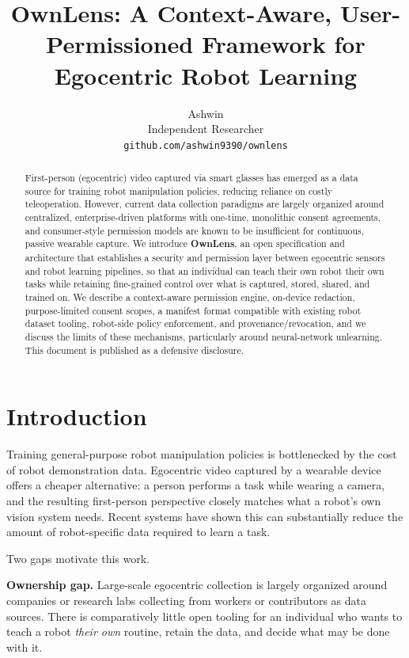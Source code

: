 \documentclass[10pt,twocolumn,letterpaper]{article}
\title{OwnLens: A Context-Aware, User-Permissioned Framework for Egocentric Robot Learning}
\author{
Ashwin \\
Independent Researcher \\
{\tt\small github.com/ashwin9390/ownlens}
}
\begin{document}
\maketitle

\begin{abstract}
First-person (egocentric) video captured via smart glasses has emerged as a data source for training robot manipulation policies, reducing reliance on costly teleoperation. However, current data collection paradigms are largely organized around centralized, enterprise-driven platforms with one-time, monolithic consent agreements, and consumer-style permission models are known to be insufficient for continuous, passive wearable capture. We introduce \textbf{OwnLens}, an open specification and architecture that establishes a security and permission layer between egocentric sensors and robot learning pipelines, so that an individual can teach their own robot their own tasks while retaining fine-grained control over what is captured, stored, shared, and trained on. We describe a context-aware permission engine, on-device redaction, purpose-limited consent scopes, a manifest format compatible with existing robot dataset tooling, robot-side policy enforcement, and provenance/revocation, and we discuss the limits of these mechanisms, particularly around neural-network unlearning. This document is published as a defensive disclosure.
\end{abstract}

\section{Introduction}

Training general-purpose robot manipulation policies is bottlenecked by the cost of robot demonstration data. Egocentric video captured by a wearable device offers a cheaper alternative: a person performs a task while wearing a camera, and the resulting first-person perspective closely matches what a robot's own vision system needs. Recent systems have shown this can substantially reduce the amount of robot-specific data required to learn a task.

Two gaps motivate this work.

\textbf{Ownership gap.} Large-scale egocentric collection is largely organized around companies or research labs collecting from workers or contributors as data sources. There is comparatively little open tooling for an individual who wants to teach a robot \emph{their own} routine, retain the data, and decide what may be done with it.
\end{document}
